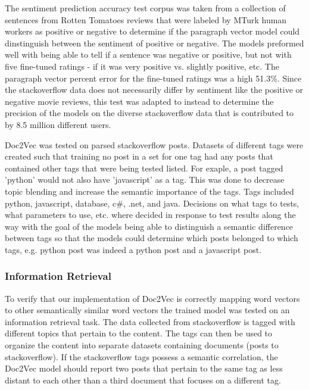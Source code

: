 The sentiment prediction accuracy test corpus was taken from a collection of sentences from Rotten Tomatoes reviews that were labeled by MTurk human workers as positive or negative to determine if the paragraph vector model could dinstinguish between the sentiment of positive or negative. The models preformed well with being able to tell if a sentence was negative or positive, but not with five fine-tuned ratings - if it was very positive vs. slightly positive, etc. The paragraph vector percent error for the fine-tuned ratings was a high 51.3\%. Since the stackoverflow data does not necessarily differ by sentiment like the positive or negative movie reviews, this test was adapted to instead to determine the precision of the models on the diverse stackoverflow data that is contributed to by 8.5 million different users. \cite{RefWorks:doc:5aa6a3c0e4b0db66bcfd06c7}

Doc2Vec was tested on parsed stackoverflow posts. Datasets of different tags were created such that training no post in a set for one tag had any posts that contained other tags that were being tested listed. For exaple, a post tagged 'python' would not also have 'javascript' as a tag. This was done to decrease topic blending and increase the semantic importance of the tags. Tags included python, javascript, database, c\#, .net, and java. Decisions on what tags to tests, what parameters to use, etc. where decided in response to test results along the way with the goal of the models being able to distinguish a semantic difference between tags so that the models could determine which posts belonged to which tags, e.g. python post was indeed a python post and a javascript post.

\subsubsection{Information Retrieval} To verify that our implementation of Doc2Vec is correctly mapping word vectors to other semantically similar word vectors the trained model was tested on an information retrieval task. The data collected from stackoverflow is tagged with different topics that pertain to the content. The tags can then be used to organize the content into separate datasets containing documents (posts to stackoverflow). If the stackoverflow tags possess a semantic correlation, the Doc2Vec model should report two posts that pertain to the same tag as less distant to each other than a third document that focuses on a different tag.

